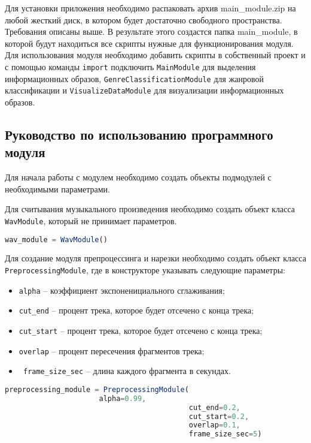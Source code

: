 Для установки приложения необходимо распаковать архив main\_module.zip на любой жесткий диск, в котором будет достаточно свободного пространства. Требования описаны выше. В результате этого создастся папка  main\_module, в которой будут находиться все скрипты нужные для функционирования модуля. Для использования модуля необходимо добавить скрипты в собственный проект и с помощью команды \texttt{import} подключить \texttt{MainModule} для выделения информационных образов, \texttt{GenreClassificationModule} для жанровой классификации и  \texttt{VisualizeDataModule} для визуализации информационных образов.

\subsection{Руководство по использованию программного модуля}
\label{sub:manual:us}

Для начала работы с модулем необходимо создать объекты подмодулей с необходимыми параметрами. 

Для считывания музыкального произведения необходимо создать объект класса \texttt{WavModule}, который не принимает параметров.

\begin{lstlisting}[language=TypeScript, label=lst:testing:results]
	wav_module = WavModule()
\end{lstlisting}

Для создание модуля препроцессинга и нарезки необходимо создать объект класса \texttt{PreprocessingModule}, где в конструкторе указывать следующие параметры:
\begin{itemize} 
\item \texttt{alpha} -- коэффициент экспоненициального сглаживания;
\item \texttt{cut\_end} -- процент трека, которое будет отсечено с конца трека;
\item \texttt{cut\_start} -- процент трека, которое будет отсечено с конца трека;
\item \texttt{overlap} -- процент пересечения фрагментов трека;
\item \texttt{ frame\_size\_sec} -- длина каждого фрагмента в секундах.
\end{itemize}

\begin{lstlisting}[language=TypeScript, label=lst:testing:results]
	preprocessing_module = PreprocessingModule(
					  alpha=0.99,
                                           cut_end=0.2,
                                           cut_start=0.2,
                                           overlap=0.1,
                                           frame_size_sec=5)
\end{lstlisting}

